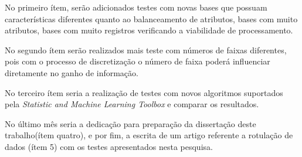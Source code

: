\begin{table}[!htbp]
\caption{Cronograma de atividades}     %
\begin{center}


\end{center}
\label{cronograma} %
\end{table}


No primeiro ítem, serão adicionados testes com novas bases que possuam características diferentes quanto ao balanceamento de atributos, bases com muito atributos, bases com muito registros verificando a viabilidade de processamento. 

No segundo ítem serão realizados mais teste com números de faixas diferentes, pois com o processo de discretização o número de faixa poderá influenciar diretamente no ganho de informação.

No terceiro ítem seria a realização de testes com novos algoritmos suportados pela \textit{Statistic and Machine Learning Toolbox} e comparar os resultados.

No último mês seria a dedicação para preparação da dissertação deste trabalho(ítem quatro), e por fim, a escrita de um artigo referente a rotulação de dados (ítem 5) com os testes apresentados nesta pesquisa.


